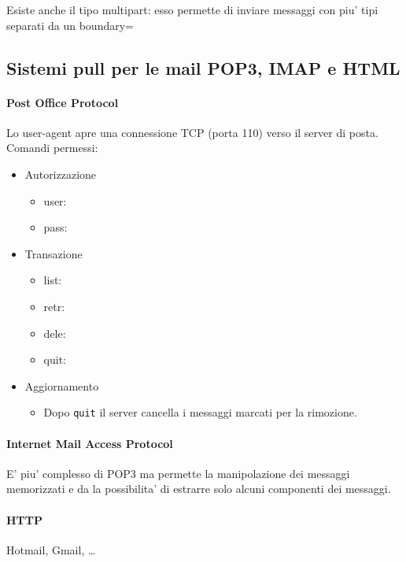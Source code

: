 Esiste anche il tipo multipart: esso permette di inviare messaggi con piu' tipi separati da un {\color{blue}boundary=}

\subsection{Sistemi pull per le mail POP3, IMAP e HTML}
\paragraph{Post Office Protocol} Lo user-agent apre una connessione TCP (porta 110) verso il server di posta. Comandi permessi:
\begin{itemize}
    \item Autorizzazione
    \begin{itemize}
        \item user:
        \item pass:
    \end{itemize}
    \item Transazione
    \begin{itemize}
        \item list:
        \item retr:
        \item dele:
        \item quit:
    \end{itemize}
    \item Aggiornamento
    \begin{itemize}
        \item Dopo \texttt{quit} il server cancella i messaggi marcati per la rimozione.
    \end{itemize}
\end{itemize}
\paragraph{Internet Mail Access Protocol} E' piu' complesso di POP3 ma permette la manipolazione dei messaggi memorizzati e da la possibilita' di estrarre solo alcuni componenti dei messaggi.
\paragraph{HTTP} Hotmail, Gmail, \dots